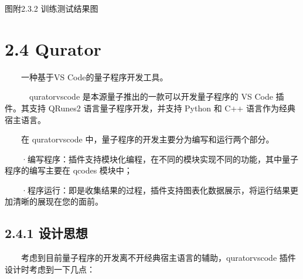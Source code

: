 \documentclass[a4paper,11pt,english]{sphinxmanual}
\let\sphinxpxdimen\pdfpxdimen\else\newdimen\sphinxpxdimen
\begin{document}
\begin{sphinxVerbatim}[commandchars=\\\{\}]
 
 

 
\end{sphinxVerbatim}

\noindent{\hspace*{\fill}\sphinxincludegraphics[width=750\sphinxpxdimen]{{图附2.3.2}.png}\hspace*{\fill}}

\begin{center}图附2.3.2 训练测试结果图
\end{center}

\section{2.4 Qurator}
\label{\detokenize{rst/_u9644_u5f552_u91cf_u5b50_u7f16_u7a0b_u5de5_u5177_u7684_u5b89_u88c5_u4e0e_u914d_u7f6e:qurator}}
\sphinxAtStartPar
  一种基于VS Code的量子程序开发工具。

\sphinxAtStartPar
   qurator\sphinxhyphen{}vscode 是本源量子推出的一款可以开发量子程序的 VS Code 插件。其支持 QRunes2 语言量子程序开发，并支持 Python 和 C++ 语言作为经典宿主语言。

\sphinxAtStartPar
  在 qurator\sphinxhyphen{}vscode 中，量子程序的开发主要分为编写和运行两个部分。

\sphinxAtStartPar
  ·编写程序：插件支持模块化编程，在不同的模块实现不同的功能，其中量子程序的编写主要在 qcodes 模块中；

\sphinxAtStartPar
  ·程序运行：即是收集结果的过程，插件支持图表化数据展示，将运行结果更加清晰的展现在您的面前。


\subsection{2.4.1 设计思想}
\label{\detokenize{rst/_u9644_u5f552_u91cf_u5b50_u7f16_u7a0b_u5de5_u5177_u7684_u5b89_u88c5_u4e0e_u914d_u7f6e:id2}}
\sphinxAtStartPar
​  考虑到目前量子程序的开发离不开经典宿主语言的辅助，qurator\sphinxhyphen{}vscode 插件设计时考虑到一下几点：
\end{document}
